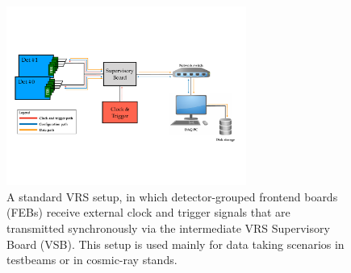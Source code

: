 \begin{figure}[!htb]
    \begin{center}
        \includegraphics[width=0.7\textwidth]{figures/nsw/vrs/vrs_diagramPDF}
        \caption{
            A standard VRS setup, in which detector-grouped frontend boards (FEBs) receive external clock
            and trigger signals that are transmitted synchronously via the intermediate VRS Supervisory Board (VSB).
            This setup is used mainly for data taking scenarios in testbeams or in cosmic-ray stands.
        }
        \label{fig:vrs_diagram}
    \end{center}
\end{figure}
\FloatBarrier
